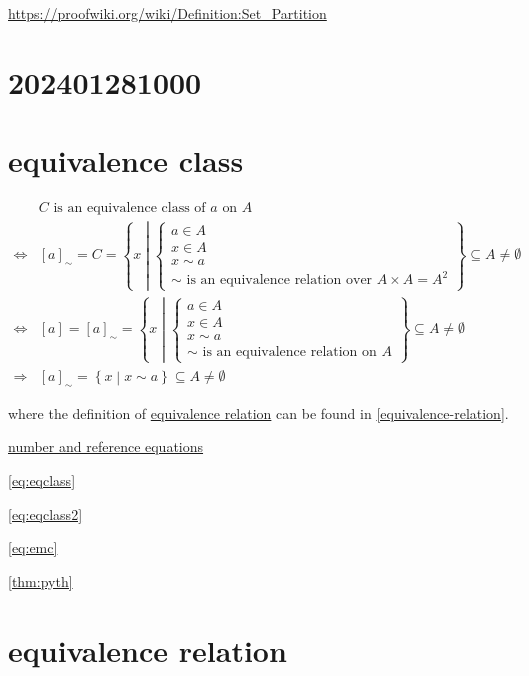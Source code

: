 \documentclass[
]{book}
\theoremstyle{definition}
\theoremstyle{definition}
\theoremstyle{definition}
\theoremstyle{definition}
\theoremstyle{remark}
\begin{document}
\url{https://proofwiki.org/wiki/Definition:Set_Partition}

\hypertarget{section}{%
\chapter*{202401281000}\label{section}}

\hypertarget{equivalence-class-1}{%
\chapter*{equivalence class}\label{equivalence-class-1}}

\begin{align*}
 & C\text{ is an equivalence class of }a\text{ on }A\\
\Leftrightarrow & \left[a\right]_{\sim}=C=\left\{ x\middle|\begin{cases}
a\in A\\
x\in A\\
x\sim a\\
\sim\text{ is an equivalence relation over }A\times A=A^{2}
\end{cases}\right\} \subseteq A\ne\emptyset\\
\Leftrightarrow & \left[a\right]=\left[a\right]_{\sim}=\left\{ x\middle|\begin{cases}
a\in A\\
x\in A\\
x\sim a\\
\sim\text{ is an equivalence relation on }A
\end{cases}\right\} \subseteq A\ne\emptyset\\
\Rightarrow & \left[a\right]_{\sim}=\left\{ x\middle|x\sim a\right\} \subseteq A\ne\emptyset
\end{align*}

where the definition of \protect\hyperlink{equivalence-relation}{equivalence relation} can be found in \ref{equivalence-relation}.

\protect\hyperlink{number-and-reference-equations}{number and reference equations}

\eqref{eq:eqclass}

\eqref{eq:eqclass2}

\eqref{eq:emc}

\ref{thm:pyth}

\hypertarget{equivalence-relation-1}{%
\chapter*{equivalence relation}\label{equivalence-relation-1}}
\end{document}
